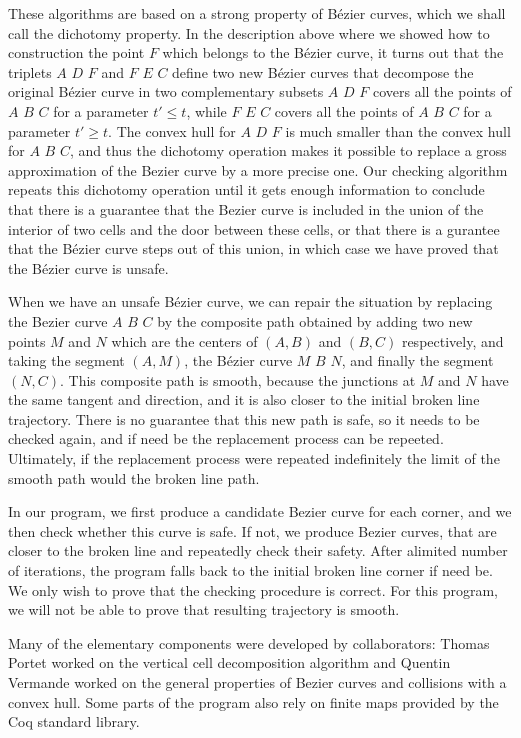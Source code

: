 \documentclass{easychair}
\begin{document}
These algorithms are based on a strong property of Bézier curves,
which we shall call the dichotomy property.  In the description above
where we showed how to construction the point \(F\) which belongs to
the Bézier curve, it turns out that the triplets \(A\) \(D\) \(F\) and
\(F\) \(E\) \(C\) define two new Bézier curves that decompose the
original Bézier curve in two complementary subsets \(A\) \(D\) \(F\)
covers all the points of \(A\) \(B\) \(C\) for a parameter \(t' \leq
t\), while \(F\) \(E\) \(C\) covers all the points of \(A\) \(B\)
\(C\) for a parameter \(t'\geq t\).  The convex hull for \(A\) \(D\)
\(F\) is much smaller than the convex hull for \(A\) \(B\) \(C\), and
thus the dichotomy operation makes it possible to replace a gross
approximation of the Bezier curve by a more precise one.  Our checking
algorithm repeats this dichotomy operation until it gets enough
information to conclude that there is a guarantee that the Bezier curve
is included in the union of the interior of two cells and the door
between these cells, or that there is a gurantee that the Bézier curve
steps out of this union, in which case we have proved that the Bézier
curve is unsafe.

When we have an unsafe Bézier curve, we can repair the situation by
replacing the Bezier curve \(A\) \(B\) \(C\) by the composite path
obtained by adding two new points \(M\) and \(N\) which are the
centers of \((A,B)\) and \((B,C)\) respectively, and taking the
segment \((A,M)\), the Bézier curve \(M\) \(B\) \(N\), and finally the
segment \((N, C)\).  This composite path is smooth, because the
junctions at \(M\) and \(N\) have the same tangent and direction, and
it is also closer to the initial broken line trajectory.  There is no
guarantee that this new path is safe, so it needs to be checked again,
and if need be the replacement process can be repeeted.  Ultimately,
if the replacement process were repeated indefinitely the limit of the
smooth path would the broken line path.

In our program, we first produce a candidate Bezier curve for each
corner, and we then check whether this curve is safe.  If not, we
produce Bezier curves, that are closer to the broken line and
repeatedly check their safety.  After alimited number of iterations,
the program falls back to the initial broken line corner if need be.
We only wish to prove that the checking procedure is correct.  For
this program, we will not be able to prove that resulting trajectory
is smooth.

Many of the elementary components were developed by collaborators:
Thomas Portet worked on the vertical cell decomposition algorithm and
Quentin Vermande worked on the general properties of Bezier curves and
collisions with a convex hull.  Some parts of the program also rely on
finite maps provided by the Coq standard library.
\end{document}
